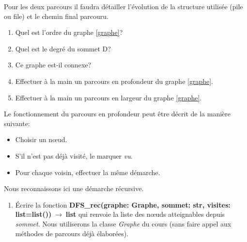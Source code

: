 \documentclass[a4paper,11pt]{article}
\begin{document}
\begin{Form}
\begin{exo}
\begin{center}
\label{graphe}
\end{center}
Pour les deux parcours il faudra détailler l'évolution de la structure utilisée (pile ou file) et le chemin final parcouru.
\begin{enumerate}
\item Quel est l'ordre du graphe \ref{graphe}?
\item Quel est le degré du sommet D?
\item Ce graphe est-il connexe?
\item Effectuer à la main un parcours en profondeur du graphe \ref{graphe}.
\item Effectuer à la main un parcours en largeur du graphe \ref{graphe}.
\end{enumerate}
\end{exo}
\begin{exo}
Le fonctionnement du parcours en profondeur peut être décrit de la manière suivante:
\begin{itemize}
\item Choisir un nœud.
\item S'il n'est pas déjà visité, le marquer \emph{vu}.
\item Pour chaque voisin, effectuer la même démarche.
\end{itemize}
Nous reconnaissons ici une démarche récursive.
\begin{enumerate}
\item Écrire la fonction \textbf{DFS\_rec(graphe: Graphe, sommet: str, visites: list=list())$\;\rightarrow\;$list} qui renvoie la liste des nœuds atteignables depuis \emph{sommet}. Nous utiliserons la classe \emph{Graphe} du cours (sans faire appel aux méthodes de parcours déjà élaborées).

\end{enumerate}
\end{exo}
\end{Form}
\end{document}
